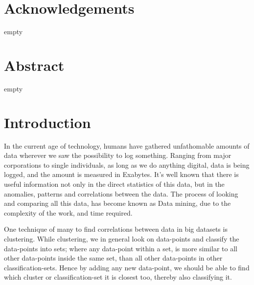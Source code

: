 \documentclass[a4paper]{article}
\begin{document}
%
%


%
%
\section*{Acknowledgements}
empty
\newpage

%
%
\section*{Abstract}
empty
\newpage

%
%
\tableofcontents
\newpage

%
%
\listofalgorithms
\newpage



%
%
\section{Introduction}
In the current age of technology, humans have gathered unfathomable amounts of data wherever
we saw the possibility to log something. Ranging from major corporations to single individuals,
as long as we do anything digital, data is being logged, and the amount is measured in Exabytes.
It's well known that there is useful information not only in the direct statistics of this data,
but in the anomalies, patterns and correlations between the data. The process of looking and
comparing all this data, has become known as Data mining, due to the complexity of the work,
and time required.

One technique of many to find correlations between data in big datasets is clustering. While
clustering, we in general look on data-points and classify the data-points
into sets; where any data-point within a set, is more similar to all other data-points inside
the same set, than all other data-points in other classification-sets. Hence by adding any new
data-point, we should be able to find which cluster or classification-set it is closest too,
thereby also classifying it. \cite{gan07}
\end{document}
